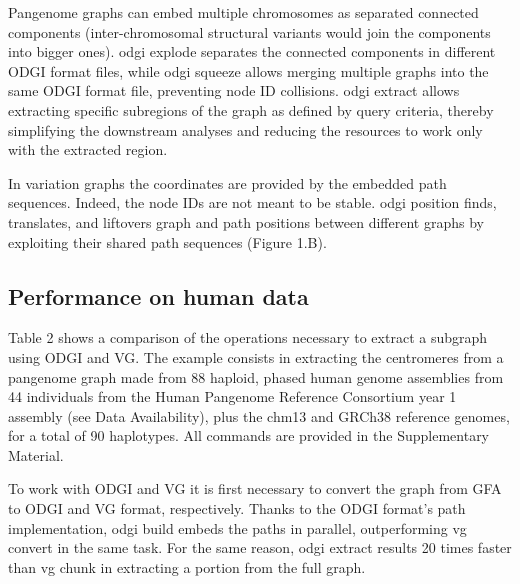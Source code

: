 \documentclass{bioinfo}
\begin{document}
Pangenome graphs can embed multiple chromosomes as separated connected components (inter-chromosomal structural variants would join the components into bigger ones). odgi explode separates the connected components in different ODGI format files, while odgi squeeze allows merging multiple graphs into the same ODGI format file, preventing node ID collisions. odgi extract allows extracting specific subregions of the graph as defined by query criteria, thereby simplifying the downstream analyses and reducing the resources to work only with the extracted region.

In variation graphs the coordinates are provided by the embedded path sequences. Indeed, the node IDs are not meant to be stable. odgi position finds, translates, and liftovers graph and path positions between different graphs by exploiting their shared path sequences (Figure 1.B).

\subsection{Performance on human data}

Table 2 shows a comparison of the operations necessary to extract a subgraph using ODGI and VG. The example consists in extracting the centromeres from a pangenome graph made from 88 haploid, phased human genome assemblies from 44 individuals from the Human Pangenome Reference Consortium year 1 assembly (see Data Availability), plus the chm13 and GRCh38 reference genomes, for a total of 90 haplotypes. All commands are provided in the Supplementary Material.

To work with ODGI and VG it is first necessary to convert the graph from GFA to ODGI and VG format, respectively. Thanks to the ODGI format’s path implementation, odgi build embeds the paths in parallel, outperforming vg convert in the same task. For the same reason, odgi extract results 20 times faster than vg chunk in extracting a portion from the full graph.

\begin{comment}


Table 2 - Centromere extraction comparison using ODGI and VG
Operation
Tool
Runtime
(mm:ss)
Memory
(GB)
Output size
(GB)
Format conversion


odgi build
1:35
10,39
5,4

vg convert
8:14
28,43
6,1
Subgraph extraction

odgi extract
1:15
9,43
2,7

vg chunk
21:09
59,33
1,7

\end{comment}
\end{document}
